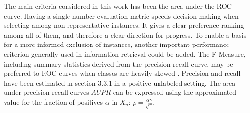 The main criteria considered in this work has been the area under the ROC curve. Having a single-number evaluation metric speeds decision-making when selecting among non-representative instances. It gives a clear preference ranking among all of them, and therefore a clear direction for progress. To enable a basis for a more informed exclusion of instances, another important performance criterion generally used in information retrieval could be added. The F-Measure, including summary statistics derived from the precision-recall curve, may be preferred to ROC curves when classes are heavily skewed \cite{jesse}. Precision and recall have been estimated in section 3.3.1 in a positive-unlabeled setting. The area under precision-recall curves \(AUPR\) can be expressed using the approximated value for the fraction of positives \(\alpha\) in \(X_u\): \(\rho = \frac{\alpha \gamma}{\hat{\eta}^{pu}}\).

